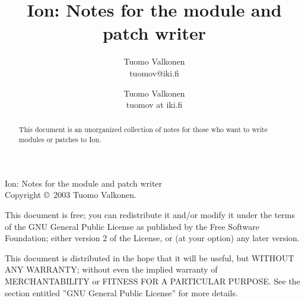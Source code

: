 \documentclass[english,a4paper,11pt,oldtoc,mctitle]{artikel3}
\title{Ion: Notes for the module and patch writer}
\author{Tuomo Valkonen \\ tuomov@iki.fi}
\author{Tuomo Valkonen \\ tuomov at iki.fi}
\begin{document}
\maketitle

Ion: Notes for the module and patch writer\\
Copyright \copyright\  2003 Tuomo Valkonen.

This document is free; you can redistribute it and/or modify
it under the terms of the GNU General Public License as published by
the Free Software Foundation; either version 2 of the License, or
(at your option) any later version.

This document is distributed in the hope that it will be useful,
but WITHOUT ANY WARRANTY; without even the implied warranty of
MERCHANTABILITY or FITNESS FOR A PARTICULAR PURPOSE.  See the
section entitled ''GNU General Public License'' for more details.

\bigskip

\begin{abstract}
    This document is an unorganized collection of notes for
    those who want to write modules or patches to Ion.
\end{abstract}

\tableofcontents











\appendix



\printindex
\end{document}
